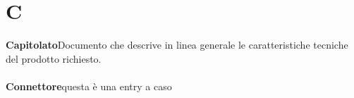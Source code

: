\newpage
\section{C}\label{l:C}
\textbf{Capitolato}\newline Documento che descrive in linea generale le caratteristiche tecniche del prodotto richiesto.\\\\

\textbf{Connettore}\newline questa è una entry a caso
